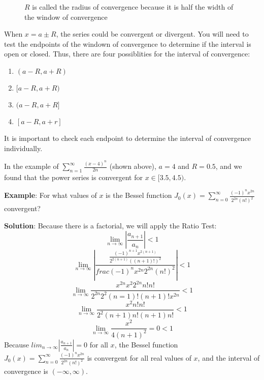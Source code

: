 \begin{figure}[htbp]
\centering
    \caption{$R$ is called the radius of convergence because it is half the 
    width of the window of convergence}
    \label{fig:radiusofconv}
\end{figure}

When $x = a \pm R$, the series could be convergent or divergent. You will need 
to test the endpoints of the windown of convergence to determine if the 
interval is open or closed. Thus, there are four possiblities for the interval 
of convergence:
\begin{enumerate}
\item $(a - R, a + R)$
\item$[a - R, a + R)$
\item$(a - R, a + R]$
\item$[a - R, a + r]$
\end{enumerate}

It is important to check each endpoint to determine the interval of convergence individually. 

In the example of $\sum_{n=1}^\infty \frac{(x-4)^n}{2n}$ (shown above), 
$a = 4$ and $R = 0.5$, and we found that the power series is convergent for 
$x \in [3.5, 4.5)$. 

\textbf{Example}: For what values of $x$ is the Bessel function $J_0 (x) = 
\sum_{n=0}^\infty \frac{(-1)^n x^{2n}}{2^{2n}(n!)^2}$ convergent? 

\textbf{Solution}: Because there is a factorial, we will apply the Ratio Test:
$$\lim_{n \to \infty} \left| \frac{a_{n + 1}}{a_n} \right| <  1$$
$$\lim_{n \to \infty} \left| \frac{\frac{(-1)^{n + 1} x^{2(n + 1)}}{2^{2(n + 1
)}((n + 1)!)^2}}{frac{(-1)^n x^{2n}}{2^{2n}(n!)^2}} \right| < 1$$
$$\lim_{n \to \infty} \frac{x^{2n} x^2 2^{2n} n! n!}{2^{2n} 2^2 (n = 1)! (n + 
1)! x^{2n}} < 1$$
$$\lim_{n \to \infty} \frac{x^2 n! n!}{2^2 (n + 1)n! (n + 1)n!} < 1$$
$$\lim_{n \to \infty} \frac{x^2}{4(n + 1)^2} = 0 < 1$$
Because $lim_{n \to \infty} \left| \frac{a_{n + 1}}{a_n} \right| = 0$ for all 
$x$, the Bessel function $J_0 (x) = \sum_{n=0}^\infty \frac{(-1)^n x^{2n}}{2^{
2n}(n!)^2}$ is convergent for all real values of $x$, and the interval of 
convergence is $(-\infty, \infty)$. 

